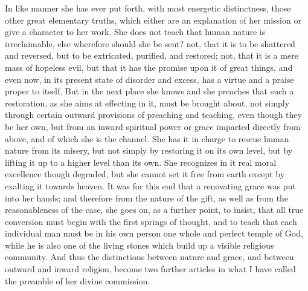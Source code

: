 In like manner she has ever put forth, with most energetic
distinctness, those other great elementary truths, which either are an
explanation of her mission or give a character to her work. She does not
teach that human nature is irreclaimable, else wherefore should she be
sent? not, that it is to be shattered and reversed, but to be
extricated, purified, and restored; not, that it is a mere mass
of hopeless evil, but that it has the promise upon it of
great things, and even now, in its present state of disorder and
excess, has a virtue and a praise proper to itself. But in the next
place she knows and she preaches that such a restoration, as she aims at
effecting in it, must be brought about, not simply through certain outward provisions of preaching and teaching, even though
they be her own, but from an inward spiritual
power or grace imparted directly from above, and of which she is the channel. She has
it in charge to rescue human nature from its
misery, but not simply by restoring it on its own level, but
by lifting it up to a higher level than its own. She recognizes in it
real moral excellence though degraded, but she cannot set it free from
earth except by exalting it towards heaven. It was for this end that a
renovating grace was put into her hands; and therefore from the nature
of the gift, as well as from the reasonableness of the case, she goes
on, as a further point, to insist, that all true conversion must begin
with the first springs of thought, and to teach that each individual man
must be in his own person one whole and perfect temple of God, while he
is also one of the living stones which build up a visible religious
community. And thus the distinctions between nature and grace, and
between outward and inward religion, become two further articles in what
I have called the preamble of her divine commission.

